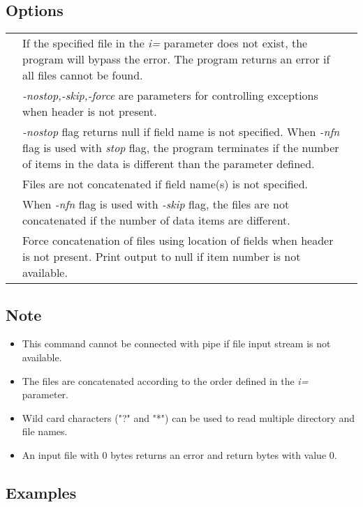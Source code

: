 \documentclass[a4paper]{jarticle}
\begin{document}
\subsection*{Options}
\begin{table}[htbp]
{\small
\begin{tabular}{l p{15cm} l}
\verb [-skip_fnf] 	& If the specified file in  the \emph{i=} parameter does not exist, the program will bypass the error. The program returns an error if all files cannot be found. \\
\verb [-nostop] 	  & \emph{-nostop,-skip,-force} are parameters for controlling exceptions when header is not present. \\
& \emph{-nostop} flag returns null if field name is not specified. When \emph{-nfn} flag is used with \emph{stop} flag, the program terminates if the number of items in the data is different than the parameter defined. \\
\verb [-skip] 		& Files are not concatenated if field name(s) is not specified. \\
& When \emph{-nfn} flag is used with \emph{-skip} flag, the files are not concatenated if the number of data items are different. \\
\verb [-force] 		& Force concatenation of files using location of fields when header is not present. Print output to null if item number is not available. \\
\end{tabular}
}
\end{table}


\subsection*{Note}
\begin{itemize}
\item This command cannot be connected with pipe if file input stream is not available. 
\item The files are concatenated according to the order defined in the \emph{i=} parameter. 
\item Wild card characters ("?" and "*") can be used to read multiple directory and file names. 
\item An input file with 0 bytes returns an error and return bytes with value 0. 
\end{itemize}

\subsection*{Examples}
\end{document}
